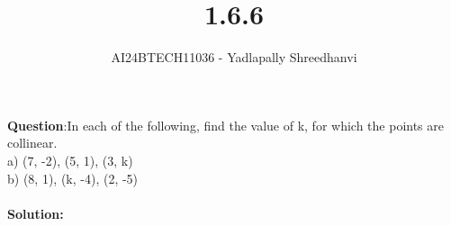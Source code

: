\documentclass[journal]{IEEEtran}
\begin{document}

\vspace{3cm}

\title{1.6.6}
\author{AI24BTECH11036 - Yadlapally Shreedhanvi}
{\let\newpage\relax\maketitle}

\renewcommand{\thefigure}{\theenumi}
\renewcommand{\thetable}{\theenumi}
\setlength{\intextsep}{10pt} %


\renewcommand{\thetable}{\theenumi}


\textbf{Question}:In each of the following, find the value of k, for which the points are collinear.\\
a) (7, -2), (5, 1), (3, k)\\
b) (8, 1), (k, -4), (2, -5)\\ \\

\textbf{Solution: }
\end{document}
